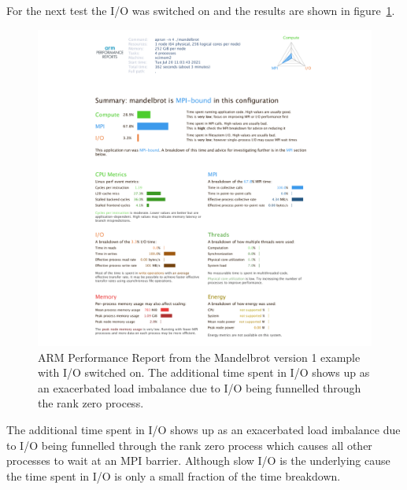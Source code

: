 \documentclass[a4paper,titlepage]{article}
\begin{document}
For the next test the I/O was switched on and the results are shown in figure~\ref{fig:perf-report_MB1_IO}.
\begin{figure}[htbp]
\begin{center}
\includegraphics[scale=0.35]{figures/mandelbrot_v1_IO_PerformanceReport}
\caption{ARM Performance Report from the Mandelbrot version 1 example with I/O switched on. The additional time spent in I/O shows up as an exacerbated load imbalance due to I/O being funnelled through the rank zero process.}
\label{fig:perf-report_MB1_IO}
\end{center}
\end{figure}
The additional time spent in I/O shows up as an exacerbated load imbalance due to I/O being funnelled through the rank zero process which causes all other processes to wait at an MPI barrier. Although slow I/O is the underlying cause the time spent in I/O is only a small fraction of the time breakdown.
\end{document}
